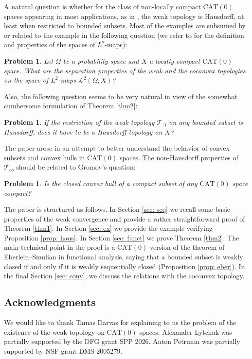 \documentclass[12pt,leqno]{amsart}
\numberwithin{equation}{section}
\newtheorem{quest}[thm]{Problem}
\theoremstyle{remark}
\newcommand{\CAT}{\mathrm{CAT}}
\begin{document}
A natural question is whether for the class of non-locally compact $\CAT(0)$ spaces appearing in most applications, as in \cite{Monod,Streets,Darvas,Clarke,Clarke2}, the weak topology is Hausdorff, at least when restricted to bounded subsets. Most of the examples are subsumed by or related to the example in the following question (we refer to \cite{Monod} for the definition and properties of the spaces of $L^2$-maps):

\begin{quest}
	Let $\Omega$ be a probability space and $X$ a locally compact $\CAT(0)$ space. What are the separation properties of the weak and the coconvex topologies on the space of $L^2$-maps $\mathcal L^2 (\Omega, X)$?
\end{quest}

Also, the following question seems to be very natural in view of the somewhat cumbersome formulation of Theorem \ref{thm2}:

\begin{quest}
	If the restriction of the weak topology $\mathcal T_{\Delta}$ on any bounded subset is Hausdorff, does it have to be a Hausdorff topology on $X$?
\end{quest} 

The paper arose in an attempt to better understand the behavior of convex subsets and convex hulls in $\CAT(0)$ spaces. The non-Hausdorff properties of $\mathcal T_{co}$ should be related to Gromov's question:

\begin{quest}
Is the closed convex hull of a compact subset of any $\CAT(0)$ space compact?
\end{quest}

The paper is structured as follows. In Section \ref{sec: seq} we recall some basic properties of the weak convergence and provide a rather straightforward proof of Theorem \ref{thm1}. In Section \ref{sec: ex} we provide the example verifying Proposition \ref{prop: haus}.
In Section \ref{sec: funct} we prove Theorem \ref{thm2}. The main technical point in the proof is a $\CAT(0)$-version of the theorem of Eberlein--Smulian in functional analysis, saying that a bounded subset is weakly closed if and only if it is weakly sequentially closed (Proposition \ref{prop: eber}).
In the final Section \ref{sec: conv}, we discuss the relations with the coconvex topology. 

\subsection*{Acknowledgments}
We would like to thank Tamas Darvas for explaining to us the problem of the existence of the weak topology on 
$\CAT(0)$ spaces.
Alexander Lytchak was partially supported by the DFG grant SPP 2026.
Anton Petrunin was partially supported by NSF grant DMS-2005279.
\end{document}
